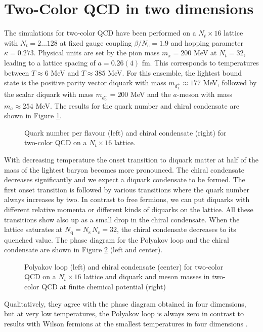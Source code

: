\documentclass{PoS}
\begin{document}
\section{Two-Color QCD in two dimensions}
\noindent
The simulations for two-color QCD have been performed on a $N_t \times 16$ lattice with $N_t=2 \dots 128$ at fixed gauge coupling $\beta/N_\text{c}=1.9$ and hopping parameter $\kappa=0.273$. Physical units are set by the pion mass
$m_\pi=200$ MeV at $N_t=32$, leading to a lattice spacing of $a=0.26(4)$ fm. This corresponds to temperatures between $T\approx6$ MeV and $T\approx385$ MeV. 
For this ensemble, the lightest bound state is the positive parity vector diquark with mass $m_{d_1^+}\approx177$ MeV, followed by the scalar diquark with mass $m_{d_0^+}=200$ MeV and the $a$-meson with mass $m_a\approx 254$ MeV. 
The results for the quark number and chiral condensate are shown in Figure \ref{twocolor}.
\begin{figure}[htb]
    \scalebox{1}{}\hskip10mm
    \scalebox{1}{}
  \caption{Quark number per flavour (left) and chiral condensate (right) for two-color QCD on a $N_t \times 16$ lattice.} 
     \label{twocolor}
   \end{figure}
   With decreasing temperature the onset transition to diquark matter at half of the mass of the lightest baryon becomes more pronounced. The chiral condensate decreases significantly and we expect a diquark condensate to be formed. The first onset transition is
   followed by various transitions where the quark number always increases by two. In contrast to free fermions, we can put diquarks with different relative momenta or different kinds of diquarks on the lattice. All these transitions
   show also up as a small drop in the chiral condensate. When the lattice saturates at $N_\text{q}=N_\text{s} \, N_\text{c}=32$, the chiral condensate decreases to its quenched value. The phase diagram for the Polyakov loop and the chiral
   condensate are shown in Figure \ref{twocolorPD} (left and center).
\begin{figure}[htb]
    \scalebox{0.71}{}
    \scalebox{0.71}{}
    \scalebox{0.71}{}
  \caption{Polyakov loop (left) and chiral condensate (center) for two-color QCD on a $N_t \times 16$ lattice and diquark and meson masses in two-color QCD at finite chemical potential (right)} 
     \label{twocolorPD}
   \end{figure}
   Qualitatively, they agree with the phase diagram obtained in four dimensions, but at very low temperatures, the Polyakov loop is always zero in contrast to results with Wilson fermions at the smallest temperatures in four dimensions \cite{Holicki:2017psk}. 
\end{document}
